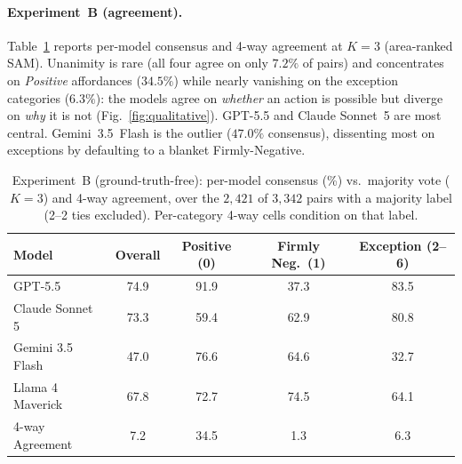 \documentclass[runningheads]{llncs}
\begin{document}
\paragraph{Experiment~B (agreement).}
Table~\ref{tab:main} reports per-model consensus and 4-way agreement at $K=3$ (area-ranked SAM).
Unanimity is rare (all four agree on only $7.2\%$ of pairs) and concentrates on \emph{Positive} affordances ($34.5\%$) while nearly vanishing on the exception categories ($6.3\%$): the models agree on \emph{whether} an action is possible but diverge on \emph{why} it is not (Fig.~\ref{fig:qualitative}).
GPT-5.5 and Claude Sonnet~5 are most central. 
Gemini~3.5~Flash is the outlier ($47.0\%$ consensus), dissenting most on exceptions by defaulting to a blanket Firmly-Negative.

\begin{table}[t]
  \centering
  \footnotesize
  \caption{Experiment~B (ground-truth-free): per-model consensus (\%) vs.\ majority vote ($K=3$) and 4-way agreement, over the $2{,}421$ of $3{,}342$ pairs with a majority label (2--2 ties excluded). Per-category 4-way cells condition on that label.}
  \label{tab:main}
  \begin{tabular}{lcccc}
    \toprule
    Model & Overall & Positive (0) & Firmly Neg.\ (1) & Exception (2--6) \\
    \midrule
    GPT-5.5           & 74.9 & 91.9 & 37.3 & 83.5 \\
    Claude Sonnet 5   & 73.3 & 59.4 & 62.9 & 80.8 \\
    Gemini 3.5 Flash  & 47.0 & 76.6 & 64.6 & 32.7 \\
    Llama 4 Maverick  & 67.8 & 72.7 & 74.5 & 64.1 \\
    \midrule
    4-way Agreement   & 7.2 & 34.5 & 1.3 & 6.3 \\
    \bottomrule
  \end{tabular}
\end{table}
\end{document}
